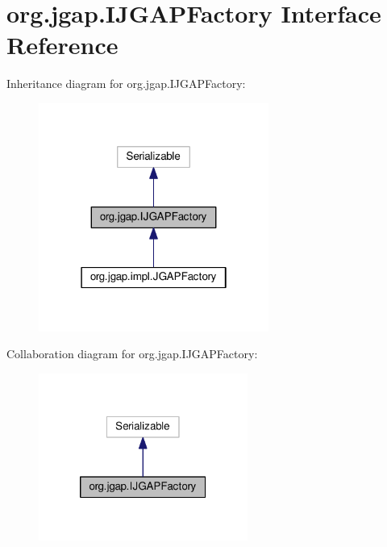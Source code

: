 \hypertarget{interfaceorg_1_1jgap_1_1_i_j_g_a_p_factory}{\section{org.\-jgap.\-I\-J\-G\-A\-P\-Factory Interface Reference}
\label{interfaceorg_1_1jgap_1_1_i_j_g_a_p_factory}
}


Inheritance diagram for org.\-jgap.\-I\-J\-G\-A\-P\-Factory\-:
\nopagebreak
\begin{figure}[H]
\begin{center}
\leavevmode
\includegraphics[width=214pt]{interfaceorg_1_1jgap_1_1_i_j_g_a_p_factory__inherit__graph}
\end{center}
\end{figure}


Collaboration diagram for org.\-jgap.\-I\-J\-G\-A\-P\-Factory\-:
\nopagebreak
\begin{figure}[H]
\begin{center}
\leavevmode
\includegraphics[width=194pt]{interfaceorg_1_1jgap_1_1_i_j_g_a_p_factory__coll__graph}
\end{center}
\end{figure}

